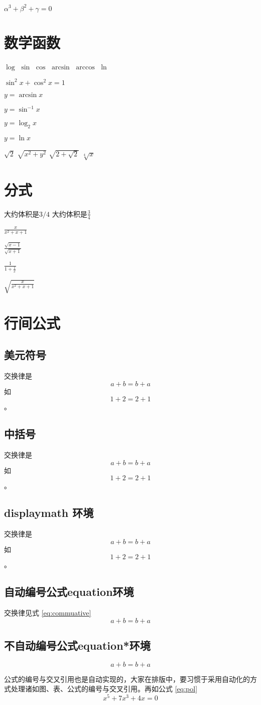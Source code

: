 \documentclass{article}
\begin{document}
	$\alpha^3 + \beta^2 + \gamma = 0$
	\section{数学函数}
	$\log$
	$\sin$
	$\cos$
	$\arcsin$
	$\arccos$
	$\ln$
	
	$\sin^2 x + \cos^2 x = 1$
	
	$y = \arcsin x$
	
	$y= \sin^{-1} x$
	
	$y = \log_2 x$
	
	$y = \ln x$
	
	$\sqrt{2}$
	$\sqrt{x^2 + y^2}$
	$\sqrt{2 + \sqrt{2}}$
	$\sqrt[4]{x}$
	\section{分式}
	大约体积是$3/4$
	大约体积是$\frac{3}{4}$
	
	$\frac{x}{x^2 + x + 1}$
	
	$\frac{\sqrt{x - 1}}{\sqrt{x + 1}}$
	
	$\frac{1}{1 + \frac{1}{x}}$
	
	$\sqrt{\frac{x}{x^2 + x + 1}}$
	
	\section{行间公式}
	\subsection{美元符号}
	交换律是
	$$a+b=b+a$$
	如 $$1+2=2+1$$。
	\subsection{中括号}
	交换律是
	\[a+b=b+a\]
	如 \[1+2=2+1\]。
	\subsection{displaymath 环境}
	交换律是 \begin{displaymath}a+b=b+a\end{displaymath}
	如 \begin{displaymath}1+2=2+1\end{displaymath}。
	\subsection{自动编号公式equation环境}
	交换律见式 \ref{eq:commuative}
	\begin{equation}
		a+b=b+a \label{eq:commuative}
	\end{equation}
	\subsection{不自动编号公式equation*环境}
	\begin{equation*}
		a+b=b+a 
	\end{equation*}

	公式的编号与交又引用也是自动实现的，大家在排版中，要习惯于采用自动化的方式处理诸如图、表、公式的编号与交叉引用。再如公式 \ref{eq:pol}
	\begin{equation}
		x^5 + 7x^3 + 4x = 0 \label{eq:pol}
	\end{equation}
\end{document}
